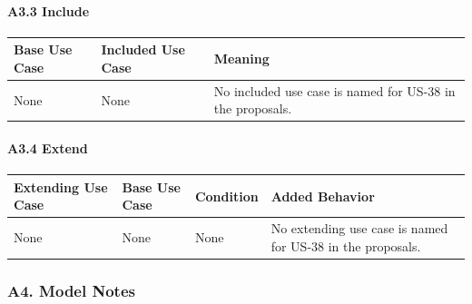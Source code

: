 \documentclass[12pt]{article}
\renewcommand{\baselinestretch}{1.5}
\begin{document}
\paragraph*{A3.3 Include}
\par\medskip

\begingroup
\small
\renewcommand{\baselinestretch}{1.0}\selectfont
\renewcommand{\arraystretch}{1.15}
\setlength{\tabcolsep}{6pt}
\begin{longtable}{|>{\raggedright\arraybackslash}p{}|>{\raggedright\arraybackslash}p{}|>{\raggedright\arraybackslash}p{}|}
\hline
\textbf{Base Use Case} & \textbf{Included Use Case} & \textbf{Meaning} \\ \hline
\endhead
None & None & No included use case is named for US-38 in the proposals. \\ \hline
\end{longtable}
\endgroup
\par\medskip

\hypertarget{sec:a3-4-extend}{}
\paragraph*{A3.4 Extend}
\par\medskip

\begingroup
\small
\renewcommand{\baselinestretch}{1.0}\selectfont
\renewcommand{\arraystretch}{1.15}
\setlength{\tabcolsep}{6pt}
\begin{longtable}{|>{\raggedright\arraybackslash}p{}|>{\raggedright\arraybackslash}p{}|>{\raggedright\arraybackslash}p{}|>{\raggedright\arraybackslash}p{}|}
\hline
\textbf{Extending Use Case} & \textbf{Base Use Case} & \textbf{Condition} & \textbf{Added Behavior} \\ \hline
\endhead
None & None & None & No extending use case is named for US-38 in the proposals. \\ \hline
\end{longtable}
\endgroup
\par\medskip

\hypertarget{sec:a4-model-notes}{}
\subsubsection*{A4. Model Notes}
\par\medskip
\end{document}
